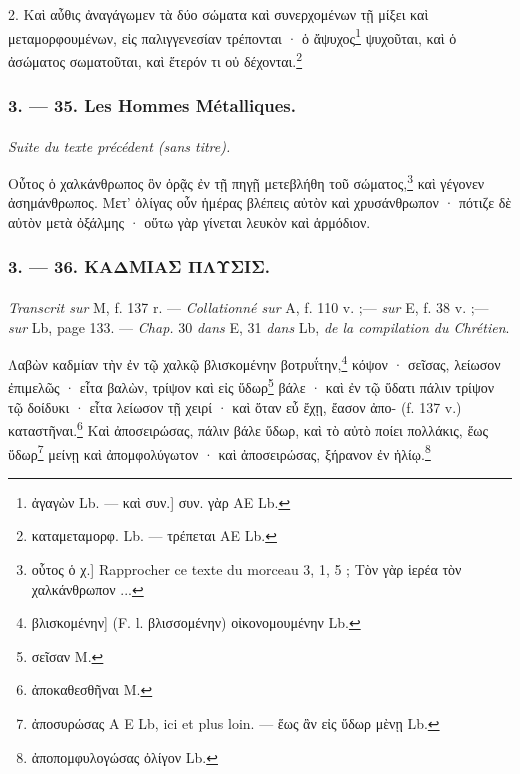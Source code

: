 \documentclass[landscape, a4paper, 11pt, oneside, polutonikogreek, french]{article}
\begin{document}
2. Καὶ αὖθις ἀναγάγωμεν τὰ δύο σώματα καὶ συνερχομένων τῇ μίξει καὶ μεταμορφουμένων, εἰς παλιγγενεσίαν τρέπονται · ὁ ἄψυχος\footnote{ἀγαγὼν Lb. --- καὶ συν.] συν. γὰρ AE Lb.} ψυχοῦται, καὶ ὁ ἀσώματος σωματοῦται, καὶ ἕτερόν τι οὐ δέχονται.\footnote{καταμεταμορφ. Lb. --- τρέπεται AE Lb.}

\bigskip
\centerline{\EightStarTaper}
\centerline{\EightStarTaper\EightStarTaper}
\bigskip

\subsubsection{3. --- 35. Les Hommes Métalliques.}
\paragraph{}
\emph{Suite du texte précédent (sans titre).}

\bigskip

Οὖτος ὁ χαλκάνθρωπος ὃν ὁρᾷς ἐν τῇ πηγῇ μετεβλήθη τοῦ σώματος,\footnote{οὗτος ὁ χ.] Rapprocher ce texte du morceau 3, 1, 5 ; Τὸν γὰρ ἱερέα τὸν χαλκάνθρωπον ...} καὶ γέγονεν ἀσημάνθρωπος. Μετ' ὀλίγας οὖν ἡμέρας βλέπεις αὐτὸν καὶ χρυσάνθρωπον · πότιζε δὲ αὐτὸν μετὰ ὀξάλμης · οὕτω γὰρ γίνεται λευκὸν καὶ ἁρμόδιον.

\bigskip
\centerline{\EightStarTaper}
\centerline{\EightStarTaper\EightStarTaper}
\bigskip

\subsubsection{3. --- 36. ΚΑΔΜΙΑΣ ΠΛΥΣΙΣ.}
\paragraph{}
\emph{Transcrit sur} M, f. 137 r. --- \emph{Collationné sur} A, f. 110 v. ;--- \emph{sur} E, f. 38 v. ;--- \emph{sur} Lb, page 133. --- \emph{Chap.} 30 \emph{dans} E, 31 \emph{dans} Lb, \emph{de la compilation du Chrétien}.

\bigskip

Λαβὼν καδμίαν τὴν ἐν τῷ χαλκῷ βλισκομένην βοτρυΐτην,\footnote{βλισκομένην] (F. l. βλισσομένην) οἰκονομουμένην Lb.} κόψον · σεῖσας, λείωσον ἐπιμελῶς · εἶτα βαλὼν, τρίψον καὶ εἰς ὕδωρ\footnote{σεῖσαν M.} βάλε · καὶ ἐν τῷ ὕδατι πάλιν τρίψον τῷ δοίδυκι · εἶτα λείωσον τῇ χειρί · καὶ ὅταν εὖ ἔχῃ, ἔασον ἀπο- (f. 137 v.) καταστῆναι.\footnote{ἀποκαθεσθῆναι M.} Καὶ ἀποσειρώσας, πάλιν βάλε ὕδωρ, καὶ τὸ αὐτὸ ποίει πολλάκις, ἕως ὕδωρ\footnote{ἀποσυρώσας A E Lb, ici et plus loin. --- ἕως ἂν εἰς ὕδωρ μὲνῃ Lb.} μείνῃ καὶ ἀπομφολύγωτον · καὶ ἀποσειρώσας, ξήρανον ἐν ἡλίῳ.\footnote{ἀποπομφυλογώσας ὀλίγον Lb.}
\end{document}
